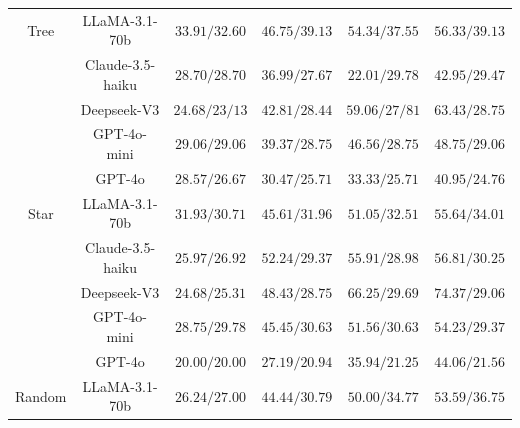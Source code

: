 \begin{table}
{\begin{tabular}{c|c|cccc}
        \rowcolor{gray!10}
        \cellcolor{gray!10} Tree & LLaMA-3.1-70b &
        $33.91/32.60$ &
        $46.75/39.13$ &
        $54.34/37.55$ &
        $56.33/39.13$  \\
        \rowcolor{white}
        \cellcolor{gray!10} & Claude-3.5-haiku &
        $28.70/28.70$ &
        $36.99/27.67$ &
        $22.01/29.78$ &
        $42.95/29.47$  \\
        \rowcolor{gray!10}
        \cellcolor{gray!10} & Deepseek-V3 &
        $24.68/23/13$ &
        $42.81/28.44$ &
        $59.06/27/81$ &
        $63.43/28.75$  \\
        \hline
        \rowcolor{gray!10}
        \cellcolor{gray!10} & GPT-4o-mini &
        $29.06/29.06$ &
        $39.37/28.75$ &
        $46.56/28.75$ &
        $48.75/29.06$  \\
        \rowcolor{white}
        \cellcolor{gray!10} & GPT-4o &
        $28.57/26.67$ &
        $30.47/25.71$ &
        $33.33/25.71$ &
        $40.95/24.76$  \\
        \rowcolor{gray!10}
        \cellcolor{gray!10} Star & LLaMA-3.1-70b &
        $31.93/30.71$ &
        $45.61/31.96$ &
        $51.05/32.51$ &
        $55.64/34.01$  \\
        \rowcolor{white}
        \cellcolor{gray!10} & Claude-3.5-haiku &
        $25.97/26.92$ &
        $52.24/29.37$ &
        $55.91/28.98$ &
        $56.81/30.25$  \\
        \rowcolor{gray!10}
        \cellcolor{gray!10} & Deepseek-V3 &
        $24.68/25.31$ &
        $48.43/28.75$ &
        $66.25/29.69$ &
        $74.37/29.06$  \\
        \hline
        \rowcolor{gray!10}
        \cellcolor{gray!10} & GPT-4o-mini &
        $28.75/29.78$ &
        $45.45/30.63$ &
        $51.56/30.63$ &
        $54.23/29.37$  \\
        \rowcolor{white}
        \cellcolor{gray!10} & GPT-4o &
        $20.00/20.00$ &
        $27.19/20.94$ &
        $35.94/21.25$ &
        $44.06/21.56$  \\
        \rowcolor{gray!10}
        \cellcolor{gray!10} Random & LLaMA-3.1-70b &
        $26.24/27.00$ &
        $44.44/30.79$ &
        $50.00/34.77$ &
        $53.59/36.75$  \\

\end{tabular}}
\end{table}
